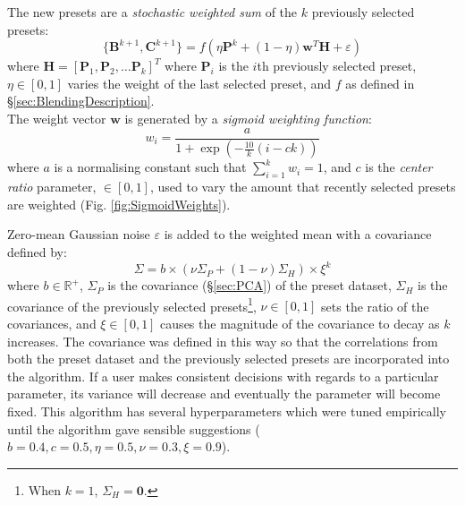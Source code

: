 \documentclass[11pt, oneside]{report}   	%
\renewcommand{\vec}[1]{\mathbf{#1}}
\begin{document}
The new presets are a \emph{stochastic weighted sum} of the $k$ previously selected presets:
\begin{equation}
\{\vec{B}^{k+1}, \vec{C}^{k+1}\} = f(\eta\vec{P}^k + (1-\eta)\vec{w}^T\vec{H} + \varepsilon) 
\end{equation}
where  $\vec{H} = [\vec{P}_1, \vec{P}_2, \dots \vec{P}_k]^T$ where $\vec{P}_i$ is the $i$th previously selected preset, $\eta\in[0, 1]$ varies the weight of the last selected preset, and $f$ as defined in \S \ref{sec:BlendingDescription}.\\
 The weight vector $\vec{w}$ is generated by a \emph{sigmoid weighting function}:
\begin{equation}
	w_i = \frac{a}{1 + \exp\left(-\frac{10}{k}(i-ck)\right)}
\end{equation}
where $a$ is a normalising constant such that $\sum_{i=1}^{k}w_i =1$, and $c$ is the \emph{center ratio} parameter, $\in [0, 1]$, used to vary the amount that recently selected presets are weighted (Fig. \ref{fig:SigmoidWeights}).

Zero-mean Gaussian noise $\varepsilon$ is added to the weighted mean with a covariance defined by:
\begin{equation}
\Sigma = b\times(\nu\Sigma_P + (1-\nu)\Sigma_H)\times\xi^k
\end{equation}
where $b\in\mathbb{R}^+$, $\Sigma_P$ is the covariance (\S \ref{sec:PCA}) of the preset dataset, $\Sigma_H$ is the covariance of the previously selected presets\footnote{When $k =1$, $\Sigma_H = \vec{0}$.}, $\nu \in [0, 1]$ sets the ratio of the covariances, and $\xi \in [0, 1]$ causes the magnitude of the covariance to decay as $k$ increases. The covariance was defined in this way so that the correlations from both the preset dataset and the previously selected presets are incorporated into the algorithm. If a user makes consistent decisions with regards to a particular parameter, its variance will decrease and eventually the parameter will become fixed. This algorithm has several hyperparameters which were tuned empirically until the algorithm gave sensible suggestions ($b=0.4, c=0.5, \eta=0.5,  \nu=0.3, \xi=0.9$).
\end{document}
